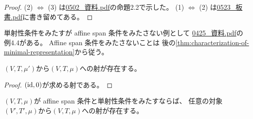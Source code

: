 \documentclass[report]{jlreq}
\begin{document}
\begin{proof}
    (2) $\iff$ (3) は\url{0502_資料.pdf}の命題2.2で示した。
    (1) $\iff$ (2) は\url{0523_板書.pdf}に書き留めてある。
\end{proof}

\begin{remark}[条件をみたさない例]
    単射性条件をみたすが affine span 条件をみたさない例として
    \url{0425_資料.pdf}の例4.4がある。
    Affine span 条件をみたさないことは
    後の\cref{thm:characterization-of-minimal-representation}から従う。

\end{remark}

\begin{lemma}[基底測度だけを変化させた対象からの射]
    $(V, T, \mu')$から$(V, T, \mu)$への射が存在する。
\end{lemma}

\begin{proof}
    $(\mathrm{id}, 0)$が求める射である。
\end{proof}

\begin{lemma}[基底測度以外を変化させた対象からの射]
    $(V, T, \mu)$が affine span 条件と単射性条件をみたすならば、
    任意の対象$(V', T', \mu)$から$(V, T, \mu)$への射が存在する。
\end{lemma}
\end{document}
